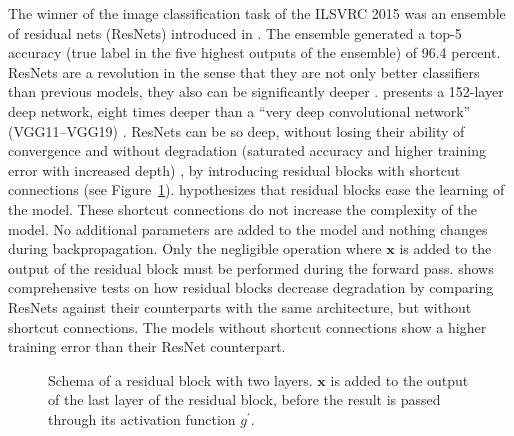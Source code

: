 \documentclass[]{article}
\begin{document}
The winner of the image classification task of the ILSVRC 2015 was an
ensemble of residual nets (ResNets) introduced in
\citet{he_et_al_2015}.
The ensemble generated a top-5 accuracy (true label in the five
highest outputs of the ensemble) of 96.4 percent.
ResNets are a revolution in the sense that they are not only better
classifiers than previous models, they also can be significantly
deeper \citep{he_et_al_2015}.
\citet{he_et_al_2015} presents a 152-layer deep network, eight times
deeper than a ``very deep convolutional network'' (VGG11--VGG19)
\citep{simonyan_et_al_2014, he_et_al_2015}.
ResNets can be so deep, without losing their ability of convergence
and without degradation (saturated accuracy and higher training error
with increased depth) \citep{he_et_al_2015}, by introducing residual
blocks with shortcut connections (see Figure~\ref{fig:shortcut_conn}).
\citet{he_et_al_2015} hypothesizes that residual blocks ease the
learning of the model.
These shortcut connections do not increase the complexity of the
model. No additional parameters are added to the model and nothing
changes during backpropagation.
Only the negligible operation where $\mathbf{x}$ is added to the
output of the residual block must be performed during the forward
pass.
\citet{he_et_al_2015} shows comprehensive tests on how residual blocks
decrease degradation by comparing ResNets against their
counterparts with the same architecture, but without shortcut
connections.
The models without shortcut connections show a higher training error
than their ResNet counterpart.

\begin{figure}
  \begin{center}
  \end{center}
  \caption{Schema of a residual block with two layers. $\mathbf{x}$ is
    added to the output of the last layer of the residual block,
    before the result is passed through its activation function
    $g^\prime$.}
  \label{fig:shortcut_conn}
\end{figure}
\end{document}
